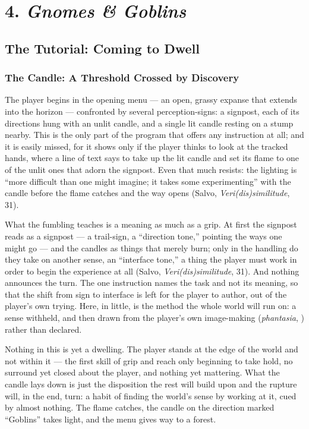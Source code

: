 \section*{4. \textit{Gnomes \& Goblins}}

\subsection*{The Tutorial: Coming to Dwell}

\subsubsection*{The Candle: A Threshold Crossed by Discovery}

The player begins in the opening menu — an open, grassy expanse that extends into the horizon — confronted by several perception-signs: a signpost, each of its directions hung with an unlit candle, and a single lit candle resting on a stump nearby. This is the only part of the program that offers any instruction at all; and it is easily missed, for it shows only if the player thinks to look at the tracked hands, where a line of text says to take up the lit candle and set its flame to one of the unlit ones that adorn the signpost. Even that much resists: the lighting is ``more difficult than one might imagine; it takes some experimenting'' with the candle before the flame catches and the way opens (Salvo, \textit{Veri(dis)similitude}, 31).

What the fumbling teaches is a meaning as much as a grip. At first the signpost reads as a signpost — a trail-sign, a ``direction tone,'' pointing the ways one might go — and the candles as things that merely burn; only in the handling do they take on another sense, an ``interface tone,'' a thing the player must work in order to begin the experience at all (Salvo, \textit{Veri(dis)similitude}, 31). And nothing announces the turn. The one instruction names the task and not its meaning, so that the shift from sign to interface is left for the player to author, out of the player's own trying. Here, in little, is the method the whole world will run on: a sense withheld, and then drawn from the player's own image-making (\textit{phantasia}, ) rather than declared.

Nothing in this is yet a dwelling. The player stands at the edge of the world and not within it — the first skill of grip and reach only beginning to take hold, no surround yet closed about the player, and nothing yet mattering. What the candle lays down is just the disposition the rest will build upon and the rupture will, in the end, turn: a habit of finding the world's sense by working at it, cued by almost nothing. The flame catches, the candle on the direction marked ``Goblins'' takes light, and the menu gives way to a forest.

